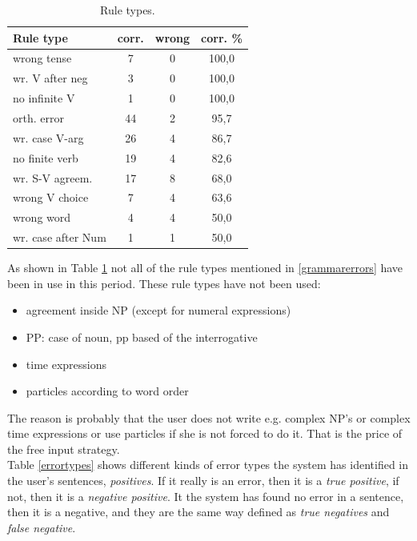 \documentclass[11pt]{article}
\begin{document}
\begin{table}[htbp]
\begin{tabular}{|l|c|c|c|}
\hline 
\textbf{Rule type}  & \textbf{corr.} & \textbf{wrong}   & \textbf{corr. \% }  \\
\hline 
wrong tense         & 7     & 0     & 100,0     \\ 
wr. V after neg   & 3     & 0     & 100,0     \\ 
no infinite V       & 1     & 0     & 100,0     \\ 
\hline 
orth. error         & 44    & 2     & 95,7      \\
wr. case V-arg  & 26    & 4     & 86,7      \\
no finite verb        & 19    & 4     &  82,6 \\
\hline 
wr. S-V agreem.   & 17    & 8     & 68,0 \\
wrong V choice        & 7     & 4     & 63,6 \\
\hline 
wrong word            & 4     & 4     & 50,0 \\
wr. case after Num  & 1     & 1     & 50,0 \\
\hline
\end{tabular}
\caption{Rule types.}
\label{ruletypes}
\end{table}

As shown in Table \ref{ruletypes} not all of the rule types mentioned in \ref{grammarerrors} have been in use in this period. These rule types have not been used:

\begin{itemize}
\setlength{\itemsep}{-0.7cm}
\item agreement inside NP (except for numeral expressions) \\
\item PP: case of noun, pp based of the interrogative  \\
\item time expressions \\
\item particles according to word order \\
\end{itemize}

The reason is probably that the user does not write e.g. complex NP's or complex time expressions or use particles if she is not forced to do it. That is the price of the free input strategy.  \\

Table \ref{errortypes} shows different kinds of error types the system has identified in the user's sentences, \textit{positives}. If it really is an error, then it is a \textit{true positive}, if not, then it is a \textit{negative positive}. It the system has found no error in a sentence, then it is a negative, and they are the same way defined as \textit{true negatives} and \textit{false negative}. \\
\end{document}
